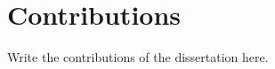 \section{Contributions}
\label{sec:conclusions:contrib}

Write the contributions of the dissertation here.